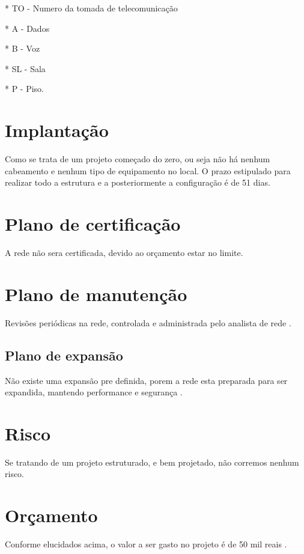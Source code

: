 \documentclass[	DIV=calc,%
							paper=a4,%
							fontsize=12pt,%
							onecolumn]{scrartcl}	 					%
\begin{document}
*  TO -  Numero da tomada de telecomunicação 

*  A -   Dados

*  B -   Voz

*  SL -  Sala

*  P -   Piso.

\section{Implantação}
Como se trata de um projeto começado do zero, ou seja não há nenhum cabeamento e nenhum tipo de equipamento no local. O prazo estipulado para realizar todo a estrutura e a posteriormente a configuração é de 51 dias.
\section{Plano de certificação}
A rede não sera certificada, devido ao orçamento estar no limite. 

\section{Plano de manutenção}

Revisões periódicas na rede, controlada e administrada pelo analista de rede .

\subsection{Plano de expansão}
Não existe uma expansão pre definida, porem a rede esta preparada para ser expandida, mantendo performance  e segurança .

\section{Risco}
Se tratando de um projeto estruturado, e bem projetado, não corremos nenhum risco. 

\section{Orçamento}
Conforme elucidados acima, o valor a ser gasto no projeto é de 50 mil reais .
\end{document}
